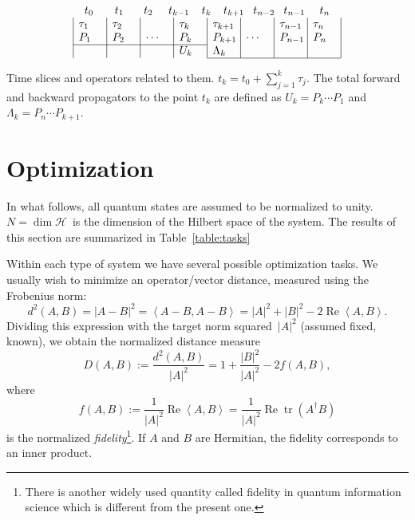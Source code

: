 \documentclass[aps, pra, a4paper, longbibliography]{revtex4}
\newcommand{\be}{\begin{equation}}
\newcommand{\ee}{\end{equation}}
\newcommand{\inprod}[2]{\left\langle #1, #2 \right\rangle}
\newcommand{\hilb}[1]{\mathcal{#1}}
\DeclareMathOperator{\tr}{tr}
\DeclareMathOperator{\re}{Re}
\begin{document}
\begin{table}[h]
\label{table:slices}
\[
\begin{array}{c}
\begin{array}{@{t_0}p{1.9em}@{t_1}p{1.8em}@{t_2}p{1.4em}@{t_{k-1}}p{1.1em}@{t_{k}}p{1.1em}@{t_{k+1}}p{0.8em}@{t_{n-2}}p{0.8em}@{t_{n-1}}p{1.3em}@{t_n}}
& & & & & & &
\end{array}\\
\begin{array}{|p{2em}|p{2em}|p{2em}|p{2em}|p{2em}|p{2em}|p{2em}|p{2em}|}
 $\tau_1$ & $\tau_2$ & & $\tau_k$ & $\tau_{k+1}$ & & $\tau_{n-1}$ & $\tau_n$ \\
 $P_1$ & $P_2$ & $\cdots$ & $P_k$ & $P_{k+1}$ & $\cdots$ & $P_{n-1}$ & $P_n$ \\
\cline{1-4}
& & & $U_{k}$ & $\Lambda_{k}$ & & & \\
\cline{5-8}
\end{array}
\end{array}
\]
\caption{Time slices and operators related to them.
$t_k = t_0 + \sum_{j=1}^{k} \tau_j$.
The total forward and backward
propagators to the point $t_k$ are defined as
$U_k = P_k \cdots P_1$ and
$\Lambda_k = P_{n} \cdots P_{k+1}$.}
\end{table}








\section{Optimization}

In what follows, all quantum states are assumed to be normalized to
unity. $N = \dim \hilb{H}$~is the dimension of the Hilbert space of the system.
The results of this section are summarized in Table~\ref{table:tasks}


Within each type of system we have several possible optimization
tasks.
We usually wish to minimize an operator/vector distance, measured using the Frobenius norm:
\be
d^2(A, B) = |A-B|^2
= \inprod{A-B}{A-B}
= |A|^2 +|B|^2 -2 \re \inprod{A}{B}.
\ee
Dividing this expression with the target norm squared~$|A|^2$ (assumed fixed,
known), we obtain the normalized distance measure
\be
\label{eq:df}
D(A,B)
:= \frac{d^2(A, B)}{|A|^2}
= 1 +\frac{|B|^2}{|A|^2} -2 f(A, B),
\ee
where
\be
f(A, B)
:= \frac{1}{|A|^2} \re \inprod{A}{B}
= \frac{1}{|A|^2} \re \tr(A^\dagger B)
\ee
is the normalized \emph{fidelity}\footnote{
There is another widely used quantity called fidelity in quantum information science which is different from the present one.}.
If $A$ and $B$ are Hermitian, the fidelity corresponds to an inner product.
\end{document}
